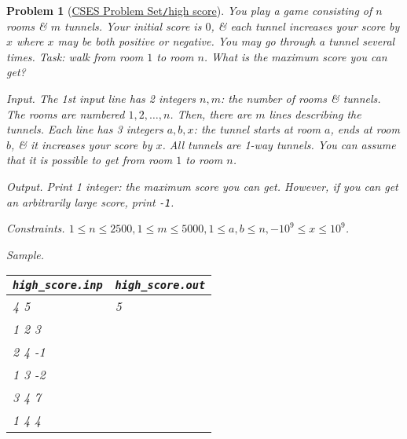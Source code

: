 \documentclass{article}
\newtheorem{problem}{Problem}
\begin{document}
\begin{problem}[\href{https://cses.fi/problemset/task/1673}{CSES Problem Set{\tt/}high score}]
	You play a game consisting of $n$ rooms \& $m$ tunnels. Your initial score is $0$, \& each tunnel increases your score by $x$ where $x$ may be both positive or negative. You may go through a tunnel several times. Task: walk from room $1$ to room $n$. What is the maximum score you can get?
	\item {\sf Input.} The 1st input line has 2 integers $n,m$: the number of rooms \& tunnels. The rooms are numbered $1,2,\ldots,n$. Then, there are $m$ lines describing the tunnels. Each line has 3 integers $a,b,x$: the tunnel starts at room $a$, ends at room $b$, \& it increases your score by $x$. All tunnels are 1-way tunnels. You can assume that it is possible to get from room $1$ to room $n$.
	\item {\sf Output.} Print 1 integer: the maximum score you can get. However, if you can get an arbitrarily large score, print {\tt-1}.
	\item {\sf Constraints.} $1\le n\le2500,1\le m\le5000,1\le a,b\le n,-10^9\le x\le10^9$.
	\item {\sf Sample.}
	\begin{table}[H]
		\centering
		\begin{tabular}{|l|l|}
			\hline
			\verb|high_score.inp| & \verb|high_score.out| \\
			\hline
			4 5 & 5 \\
			1 2 3 & \\
			2 4 -1 & \\
			1 3 -2 & \\
			3 4 7 & \\
			1 4 4 & \\
			\hline
		\end{tabular}
	\end{table}
\end{problem}
\end{document}

